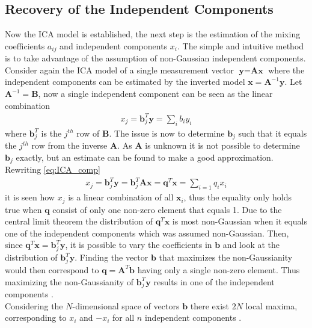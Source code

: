 \subsection{Recovery of the Independent Components}\label{sec:est_ica}
Now the ICA model is established, the next step is the estimation of the mixing coefficients $a_{ij}$ and independent components $x_i$. 
The simple and intuitive method is to take advantage of the assumption of non-Gaussian independent components. 
Consider again the ICA model of a single measurement vector $\textbf{y}=\textbf{Ax}$ where the independent components can be estimated by the inverted model $\textbf{x}=\textbf{A}^{-1}\textbf{y}$.  
Let $\textbf{A}^{-1}=\textbf{B}$, now a single independent component can be seen as the linear combination 
\begin{align}
x_j = \textbf{b}_{j}^T \textbf{y} = \sum_{i}b_iy_i \label{eq:ICA_comp}
\end{align} 
where $\textbf{b}_{j}^T$ is the $j^{th}$ row of $\textbf{B}$. 
The issue is now to determine $\textbf{b}_j$ such that it equals the $j^{th}$ row from the inverse $\textbf{A}$. 
As $\textbf{A}$ is unknown it is not possible to determine $\textbf{b}_j$ exactly, but an estimate can be found to make a good approximation. Rewriting \eqref{eq:ICA_comp} 
\begin{align*}
x_j = \textbf{b}_{j}^T \textbf{y} = \textbf{b}_{j}^T \textbf{Ax} = \textbf{q}^T\textbf{x} = \sum_{i=1}q_i x_i
\end{align*}
it is seen how $x_j$ is a linear combination of all $\textbf{x}_i$, thus the equality only holds true when $\textbf{q}$ consist of only one non-zero element that equals 1.  
Due to the central limit theorem the distribution of $\textbf{q}^T\textbf{x}$ is most non-Gaussian when it equals one of the independent components which was assumed non-Gaussian. 
Then, since $\textbf{q}^T\textbf{x} = \textbf{b}_{j}^T \textbf{y}$, it is possible to vary the coefficients in $\textbf{b}$ and look at the distribution of $\textbf{b}_{j}^T \textbf{y}$. 
Finding the vector $\textbf{b}$ that maximizes the non-Gaussianity would then correspond to $\textbf{q}=\textbf{A}^T\textbf{b}$ having only a single non-zero element. 
Thus maximizing the non-Gaussianity of $\textbf{b}_{j}^T \textbf{y}$ results in one of the independent components \cite[p. 166]{ICA}. 
\\
Considering the $N$-dimensional space of vectors $\textbf{b}$ there exist $2N$ local maxima, corresponding to $x_i$ and $-x_i$ for all $n$ independent components \cite[p. 166]{ICA}. 


